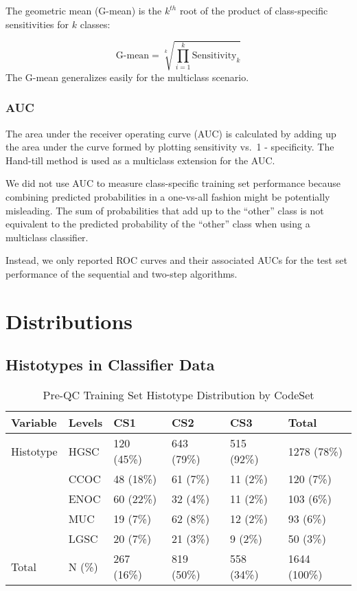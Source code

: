 \documentclass[
]{report}
\begin{document}
The geometric mean (G-mean) is the \(k^{th}\) root of the product of class-specific sensitivities for \(k\) classes:

\[
\text{G-mean} = \sqrt[k]{\prod_{i=1}^{k}{\text{Sensitivity}_k}}
\label{eq:gmean}
\] The G-mean generalizes easily for the multiclass scenario.

\subsection{AUC}\label{auc}

The area under the receiver operating curve (AUC) is calculated by adding up the area under the curve formed by plotting sensitivity vs.~1 - specificity. The Hand-till method is used as a multiclass extension for the AUC.

We did not use AUC to measure class-specific training set performance because combining predicted probabilities in a one-vs-all fashion might be potentially misleading. The sum of probabilities that add up to the ``other'' class is not equivalent to the predicted probability of the ``other'' class when using a multiclass classifier.

Instead, we only reported ROC curves and their associated AUCs for the test set performance of the sequential and two-step algorithms.

\chapter{Distributions}\label{distributions}

\section{Histotypes in Classifier Data}\label{histotypes-in-classifier-data}

\begin{table}

\caption{\label{tab:preqc-hist-codeset}Pre-QC Training Set Histotype Distribution by CodeSet}
\centering
\begin{tabular}[t]{l|l|l|l|l|l}
\hline
Variable & Levels & CS1 & CS2 & CS3 & Total\\
\hline
Histotype & HGSC & 120 (45\%) & 643 (79\%) & 515 (92\%) & 1278 (78\%)\\
\hline
 & CCOC & 48 (18\%) & 61 (7\%) & 11 (2\%) & 120 (7\%)\\
\hline
 & ENOC & 60 (22\%) & 32 (4\%) & 11 (2\%) & 103 (6\%)\\
\hline
 & MUC & 19 (7\%) & 62 (8\%) & 12 (2\%) & 93 (6\%)\\
\hline
 & LGSC & 20 (7\%) & 21 (3\%) & 9 (2\%) & 50 (3\%)\\
\hline
Total & N (\%) & 267 (16\%) & 819 (50\%) & 558 (34\%) & 1644 (100\%)\\
\hline
\end{tabular}
\end{table}
\end{document}
